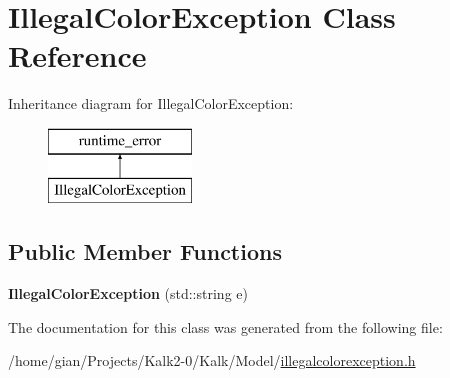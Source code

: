\hypertarget{class_illegal_color_exception}{}\section{Illegal\+Color\+Exception Class Reference}
\label{class_illegal_color_exception}
Inheritance diagram for Illegal\+Color\+Exception\+:\begin{figure}[H]
\begin{center}
\leavevmode
\includegraphics[height=2.000000cm]{class_illegal_color_exception}
\end{center}
\end{figure}
\subsection*{Public Member Functions}
\begin{DoxyCompactItemize}
\item 
\mbox{\label{class_illegal_color_exception_a2d06f0597577dae21d50835a9e95e531}} 
{\bfseries Illegal\+Color\+Exception} (std\+::string e)
\end{DoxyCompactItemize}


The documentation for this class was generated from the following file\+:\begin{DoxyCompactItemize}
\item 
/home/gian/\+Projects/\+Kalk2-\/0/\+Kalk/\+Model/\hyperlink{illegalcolorexception_8h}{illegalcolorexception.\+h}\end{DoxyCompactItemize}
